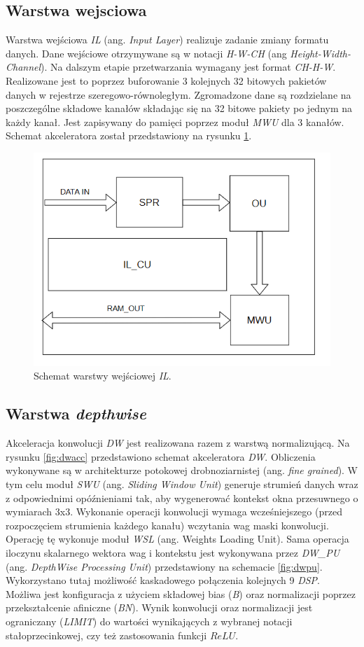 \subsection{Warstwa wejsciowa}
Warstwa wejściowa \emph{IL} (ang. \emph{Input Layer}) realizuje zadanie zmiany formatu danych.
Dane wejściowe otrzymywane są w notacji \emph{H-W-CH} (ang \emph{Height-Width-Channel}).
Na dalszym etapie przetwarzania wymagany jest format \emph{CH-H-W}.
Realizowane jest to poprzez buforowanie 3 kolejnych 32 bitowych pakietów danych w rejestrze szeregowo-równoległym.
Zgromadzone dane są rozdzielane na poszczególne składowe kanałów składając się na 32 bitowe pakiety po jednym na każdy kanał.
Jest zapisywany do pamięci poprzez moduł \emph{MWU} dla 3 kanałów.
Schemat akceleratora został przedstawiony na rysunku \ref{fig:il}.
\begin{figure}
    \centering
    \includegraphics[width=0.8\linewidth]{images/ILACC.png}
    \caption{Schemat warstwy wejściowej \emph{IL}.}
    \label{fig:il}
\end{figure}

\subsection{Warstwa \emph{depthwise}}
Akceleracja konwolucji \emph{DW} jest realizowana razem z warstwą normalizującą.
Na rysunku \ref{fig:dwacc} przedstawiono schemat akceleratora \emph{DW}.
Obliczenia wykonywane są w architekturze potokowej drobnoziarnistej (ang. \emph{fine grained}). 
W tym celu moduł \emph{SWU} (ang. \emph{Sliding Window Unit}) generuje strumień danych wraz z odpowiednimi opóźnieniami tak, aby wygenerować kontekst okna przesuwnego o wymiarach 3x3.
Wykonanie operacji konwolucji wymaga wcześniejszego (przed rozpoczęciem strumienia każdego kanału) wczytania wag maski konwolucji.
Operację tę wykonuje moduł \emph{WSL} (ang. Weights Loading Unit).
Sama operacja iloczynu skalarnego wektora wag i kontekstu jest wykonywana przez \emph{DW\_PU} (ang. \emph{DepthWise Processing Unit}) przedstawiony na schemacie \ref{fig:dwpu}.
Wykorzystano tutaj możliwość kaskadowego połączenia kolejnych 9 \emph{DSP}. 
Możliwa jest konfiguracja z użyciem składowej bias (\emph{B}) oraz normalizacji poprzez przekształcenie afiniczne (\emph{BN}).
Wynik konwolucji oraz normalizacji jest ograniczany (\emph{LIMIT}) do wartości wynikających z wybranej notacji stałoprzecinkowej, czy też zastosowania funkcji $ReLU$.

